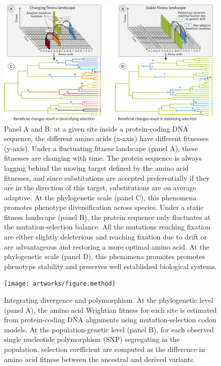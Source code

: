 \documentclass{article}
\begin{document}
    \begin{figure}[!ht]
        \centering
        \includegraphics[width=\textwidth, page=1] {artworks/figure.fitness-landscape}
        \caption{
            Panel A and B: at a given site inside a protein-coding DNA sequence, the different amino acids (x-axis) have different fitnesses (y-axis).
            Under a fluctuating fitness landscape (panel A), these fitnesses are changing with time.
            The protein sequence is always lagging behind the moving target defined by the amino acid fitnesses, and since substitutions are accepted preferentially if they are in the direction of this target, substitutions are on average adaptive.
            At the phylogenetic scale (panel C), this phenomena promotes phenotype diversification across species.
            Under a static fitness landscape (panel B), the protein sequence only fluctuates at the mutation-selection balance.
            All the mutations reaching fixation are either slightly deleterious and reaching fixation due to drift or are advantageous and restoring a more optimal amino acid.
            At the phylogenetic scale (panel D), this phenomena promotes promotes phenotype stability and preserves well established biological systems.
        }
        \label{fig:fitness-landscape}
    \end{figure}

    \begin{figure}[!ht]
        \centering
        \texttt{[image: artworks/figure.method]}
        \caption{
            Integrating divergence and polymorphism.
            At the phylogenetic level (panel A), the amino acid Wrightian fitness for each site is estimated from protein-coding DNA alignments using mutation-selection codon models.
            At the population-genetic level (panel B), for each observed single nucleotide polymorphism (SNP) segregating in the population, selection coefficient are computed as the difference in amino acid fitness between the ancestral and derived variants.
        }
        \label{fig:method}
    \end{figure}
\end{document}
